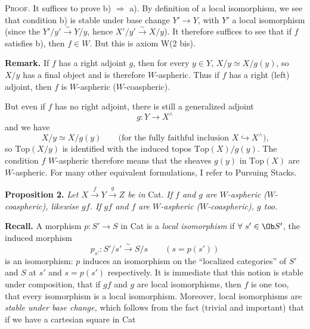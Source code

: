 \textsc{Proof.} It suffices to prove b) $\Longrightarrow$ a). By definition of a local isomorphism, we see that condition b) is stable under base change $Y' \longrightarrow Y$, with $Y'$ a local isomorphism (since the $Y'/y' \xrightarrow{\sim} Y/y$, hence $X'/y' \xrightarrow{\sim} X/y$). It therefore suffices to see that if $f$ satisfies b), then $f \in W$. But this is axiom W(2 bis).

\begin{center}
\end{center}


\textbf{Remark.} If $f$ has a right adjoint $g$, then for every $y \in Y$, $X/y \simeq X/g(y)$, so $X/y$ has a final object and is therefore $W$-aspheric. Thus if $f$ has a right (left) adjoint, then $f$ is $W$-aspheric ($W$-coaspheric).

But even if $f$ has no right adjoint, there is still a generalized adjoint
\[
g : Y \longrightarrow X^{\wedge}
\]
and we have
\[
X/y \simeq X/g(y) \qquad \text{(for the fully faithful inclusion $X \hookrightarrow X^{\wedge}$),}
\]
so $\mathrm{Top}(X/y)$ is identified with the induced topos $\mathrm{Top}(X)/g(y)$. The condition $f$ $W$-aspheric therefore means that the sheaves $g(y)$ in $\mathrm{Top}(X)$ are
$W$-aspheric. For many other equivalent formulations, I refer to Pursuing Stacks.

\textbf{Proposition 2.} \textit{Let $X \xrightarrow{f} Y \xrightarrow{g} Z$ be in} \textup{Cat}. \textit{If $f$ and $g$ are $W$-aspheric ($W$-coaspheric), likewise $gf$. If $gf$ and $f$ are $W$-aspheric ($W$-coaspheric), $g$ too.}

\textbf{Recall.} A morphism $p : S' \longrightarrow S$ in Cat is a \textit{local isomorphism} if $\forall\ s' \in \Ob S'$, the induced morphism
\[
p_{s'} : S'/s' \xrightarrow{\sim} S/s \qquad (s = p(s'))
\]
is an isomorphism: $p$ induces an isomorphism on the ``localized categories'' of $S'$ and $S$ at $s'$ and $s = p(s')$ respectively. It is immediate that this notion is stable under composition, that if $gf$ and $g$ are local isomorphisms, then $f$ is one too, that every isomorphism is a local isomorphism. Moreover, local isomorphisms are \textit{stable under base change,} which follows from the fact (trivial and important) that if we have a cartesian square in Cat

